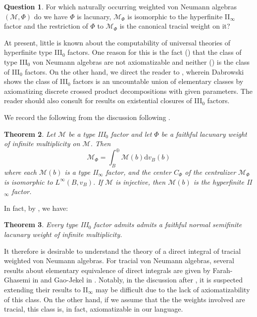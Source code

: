 \documentclass[12pt]{amsart}
\newtheorem{thm}{Theorem}[section]
\theoremstyle{definition}
\newtheorem{question}[thm]{Question}
\def\cal{\mathcal}
\begin{document}
\begin{question}
    For which naturally occurring weighted von Neumann algebras $(\cal M, \Phi)$ do we have $\Phi$ is lacunary, $\cal M_{\Phi}$ is isomorphic to the hyperfinite II$_\infty$ factor and the restriction of $\Phi$ to $\cal M_{\Phi}$ is the canonical tracial weight on it?
\end{question}

At present, little is known about the computability of universal theories of hyperfinite type III$_0$ factors.  One reason for this is the fact (\cite[Theorem 6.13]{AH}) that the class of type III$_0$ von Neumann algebras are not axiomatizable and neither (\cite[Theorem 6.18]{AH}) is the class of III$_0$ factors.  On the other hand, we direct the reader to \cite[Section 5]{Dab}, wherein Dabrowski shows the class of III$_0$ factors is an uncountable union of elementary classes by axiomatizing discrete crossed product decompositions with given parameters.  The reader should also consult \cite{GoldbringHoudayer} for results on existential closures of III$_0$ factors.

We record the following from the discussion following \cite[Lemma 4.1]{CW}.

\begin{thm}\label{centralizerIII0}
    Let $\cal M$ be a type III$_0$ factor and let $\Phi$ be a faithful lacunary weight of infinite multiplicity on $\cal M$.  Then
    \[
    \cal M_{\Phi} = \int_{B}^{\oplus} \cal M(b) \mathrm{d}v_{B}(b)
    \]
    where each $\cal M(b)$ is a type II$_\infty$ factor, and the center $C_{\Phi}$ of the centralizer $\cal M_{\Phi}$ is isomorphic to $L^\infty(B, v_B)$. If $\cal M$ is injective, then $\cal M(b)$ is the hyperfinite II$_\infty$ factor.
\end{thm}

In fact, by \cite[Lemma 5.3.2]{Connes73}, we have:

\begin{thm}\label{III0Lacunary}
    Every type III$_0$ factor admits admits a faithful normal semifinite lacunary weight of infinite multiplicity.
\end{thm}

It therefore is desirable to understand the theory of a direct integral of tracial weighted von Neumann algebras.  For tracial von Neumann algebras, several results about elementary equivalence of direct integrals are given by Farah-Ghasemi in \cite{FG} and Gao-Jekel in \cite{GaoJekel}.  Notably, in the discussion after \cite[Theorem D]{GaoJekel}, it is suspected extending their results to II$_\infty$ may be difficult due to the lack of axiomatizability of this class.  On the other hand, if we assume that the the weights involved are tracial, this class is, in fact, axiomatizable in our language.
\end{document}
